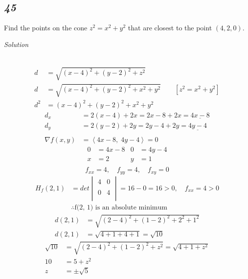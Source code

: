 \documentclass{article}
\newcommand\vv[1]{\left\langle #1 \right\rangle}
\newcommand{\solution}{\centerline{\textit{Solution}}}
\newcommand{\also}{,\quad}
\begin{document}
{{{{{{{{{{{{\begin{center}
\subsection*{\textit{45}} 
Find the points on the cone $z^2 = x^2 + y^2$ that are closest to the point
$(4,2,0)$. 
\end{center}
\solution 
{} \\
\begin{align*}
    d &= \sqrt{(x-4)^2 + (y-2)^2 + z^2} \\
    d &= \sqrt{(x-4)^2 + (y-2)^2 + x^2 + y^2}\qquad [z^2 = x^2 + y^2] \\
    d^2 &= (x-4)^2 + (y-2)^2 + x^2 + y^2 
\end{align*}
\begin{align*}
    d_x &= 2(x-4) + 2x = 2x - 8 + 2x =\underline{4x - 8} \\
    d_y &= 2(y-2)+2y= 2y-4+2y = \underline{4y - 4} \\\\
    \nabla f(x,y) &= \vv{4x-8,\;4y-4} = 0
\end{align*}
\begin{align*}
    0 &= 4x-8 & 0 &= 4y-4 \\
    x &= 2 & y &= 1 \\
\end{align*}
\[
    f_{xx} = 4\also f_{yy} = 4\also f_{xy} = 0
\]
\begin{align*}
    H_f(2,1) &= det\begin{vmatrix}
    4 & 0 \\\\
    0 & 4 \\
\end{vmatrix} = 16 - 0 = 16 > 0 \also f_{xx} = 4 > 0 \\
            &\therefore\text{f(2, 1) is an absolute minimum}
\end{align*}
\begin{align*}
    d(2,1) &= \sqrt{(2-4)^2 + (1-2)^2 + 2^2 + 1^2} \\
    d(2,1) &= \sqrt{4 + 1 + 4 + 1} = \sqrt{10}
\end{align*}
\begin{align*}
    \sqrt{10} &= \sqrt{(2 - 4)^2 + (1 - 2)^2 + z^2} = \sqrt{4+1+z^2} \\
    10 &= 5 + z^2 \\
    z &= \pm\sqrt{5} \\
\end{align*}
\begin{center}

\end{center}}}}}}}}}}}}}
\end{document}
